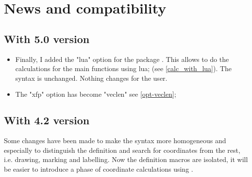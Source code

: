 \section*{News and compatibility}

\subsection{With 5.0 version} %

\begin{itemize}
  
    \item Finally, I added the "lua" option for the package \tkzname{\tkznameofpack}. This allows to do the calculations for the main functions using lua; (see \ref{calc_with_lua}). The syntax is unchanged. Nothing changes for the user.
   
  \item The "xfp" option has become  "veclen" see \ref{opt-veclen};

\end{itemize}

\subsection{With 4.2 version} %
\label{sub:with_4_2_version}

Some changes have been made to make the syntax more homogeneous and especially to distinguish the definition and search for coordinates from the rest, i.e. drawing, marking and labelling.
Now the definition macros are isolated, it will be easier to introduce a phase of coordinate calculations using .

